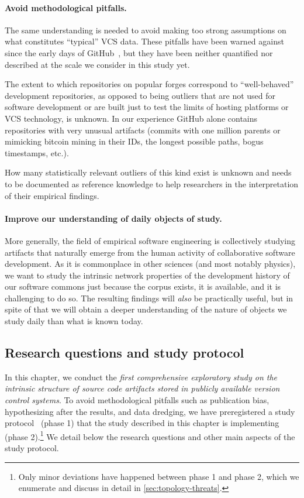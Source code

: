 \paragraph{Avoid methodological pitfalls.}

The same understanding is needed to avoid making too strong assumptions on what
constitutes ``typical'' VCS data. These pitfalls have been warned against since
the early days of GitHub~\cite{kalliamvakou2014promises}, but they have been
neither quantified nor described at the scale we consider in this study yet.

The extent to which repositories on popular forges correspond to
``well-behaved'' development repositories, as opposed to being outliers that
are not used for software development or are built just to test the limits of
hosting platforms or \gls{VCS} technology, is unknown. In our experience GitHub
alone contains repositories with very unusual artifacts (commits with one
million parents or mimicking bitcoin mining in their IDs, the longest possible
paths, bogus timestamps, etc.).

How many statistically relevant outliers of this kind exist is unknown and
needs to be documented as reference knowledge to help researchers in the
interpretation of their empirical findings.


\paragraph{Improve our understanding of daily objects of study.}

More generally, the field of empirical software engineering is collectively
studying artifacts that naturally emerge from the human activity of
collaborative software development. As it is commonplace in other sciences (and
most notably physics), we want to study the intrinsic network properties of the
development history of our software commons just because the corpus exists, it
is available, and it is challenging to do so. The resulting findings will
\emph{also} be practically useful, but in spite of that we will obtain a deeper
understanding of the nature of objects we study daily than what is known today.


\subsection{Research questions and study protocol}

In this chapter, we conduct the \emph{first comprehensive exploratory study on
  the intrinsic structure of source code artifacts stored in publicly available
  version control systems}. To avoid methodological pitfalls such as
publication bias, hypothesizing after the results, and data dredging, we have
preregistered a study protocol~\cite{msr-2020-topology} (phase 1) that the
study described in this chapter is implementing (phase 2).\footnote{Only minor
deviations have happened between phase 1 and phase 2, which we enumerate and
discuss in detail in \cref{sec:topology-threats}.} We detail below the
research questions and other main aspects of the study protocol.

